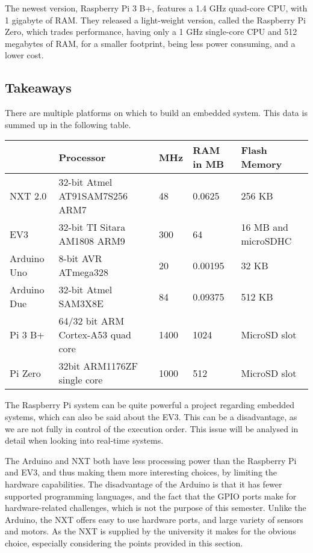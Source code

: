 The newest version, Raspberry Pi 3 B+, features a 1.4 GHz quad-core CPU, with 1 gigabyte of RAM.
They released a light-weight version, called the Raspberry Pi Zero, which trades performance, having only a 1 GHz single-core CPU and 512 megabytes of RAM, for a smaller footprint, being less power consuming, and a lower cost.

\subsection{Takeaways}
There are multiple platforms on which to build an embedded system.
This data is summed up in the following table.

\begin{table}[h]
	\begin{adjustbox}{max width=\textwidth}
	\begin{tabular}{|l|l|l|l|l|}
		\hline
		                & Processor                          & MHz 	& RAM in MB    & Flash Memory          	\\\hline
		NXT 2.0 		& 32-bit Atmel AT91SAM7S256 ARM7     & 48  	& 0.0625   & 256 KB                   	\\
		EV3     		& 32-bit TI Sitara AM1808 ARM9       & 300 	& 64   & 16 MB and microSDHC 			\\
		Arduino Uno    	& 8-bit AVR ATmega328                & 20  	& 0.00195    & 32 KB                    \\
		Arduino Due    	& 32-bit Atmel SAM3X8E               & 84  	& 0.09375   & 512 KB                   	\\
		Pi 3 B+      	& 64/32 bit ARM Cortex-A53 quad core & 1400 & 1024    & MicroSD slot            	\\
		Pi Zero       	& 32bit ARM1176ZF single core        & 1000 & 512  & MicroSD slot 					\\\hline
	\end{tabular}
\end{adjustbox}
\end{table}

The Raspberry Pi system can be quite powerful a project regarding embedded systems, which can also be said about the EV3.
This can be a disadvantage, as we are not fully in control of the execution order.
This issue will be analysed in detail when looking into real-time systems.

The Arduino and NXT both have less processing power than the Raspberry Pi and EV3, and thus making them more interesting choices, by limiting the hardware capabilities.
The disadvantage of the Arduino is that it has fewer supported programming languages, and the fact that the GPIO ports make for hardware-related challenges, which is not the purpose of this semester.
Unlike the Arduino, the NXT offers easy to use hardware ports, and large variety of sensors and motors.
As the NXT is supplied by the university it makes for the obvious choice, especially considering the points provided in this section.

